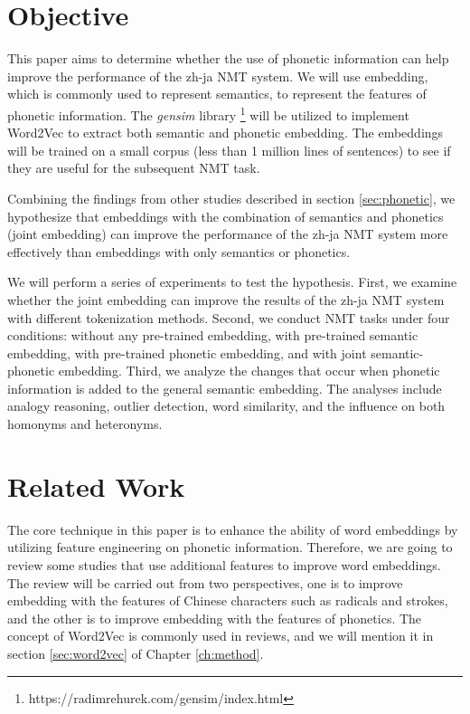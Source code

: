\section{Objective} \label{sec:objective}

This paper aims to determine whether the use of phonetic information can help improve the performance of the zh-ja NMT system. We will use embedding, which is commonly used to represent semantics, to represent the features of phonetic information. The \textit{gensim} library \footnote{https://radimrehurek.com/gensim/index.html} will be utilized to implement Word2Vec \cite{mikolov2013distributed} to extract both semantic and phonetic embedding. The embeddings will be trained on a small corpus (less than 1 million lines of sentences) to see if they are useful for the subsequent NMT task.

Combining the findings from other studies \cite{liu-etal-2019-robust, khan2019diversity} described in section \ref{sec:phonetic}, we hypothesize that embeddings with the combination of semantics and phonetics (joint embedding) can improve the performance of the zh-ja NMT system more effectively than embeddings with only semantics or phonetics. 

We will perform a series of experiments to test the hypothesis. First, we examine whether the joint embedding can improve the results of the zh-ja NMT system with different tokenization methods. Second, we conduct NMT tasks under four conditions: without any pre-trained embedding, with pre-trained semantic embedding, with pre-trained phonetic embedding, and with joint semantic-phonetic embedding. Third, we analyze the changes that occur when phonetic information is added to the general semantic embedding. The analyses include analogy reasoning, outlier detection, word similarity, and the influence on both homonyms and heteronyms.

\section{Related Work} \label{sec:related_work}

The core technique in this paper is to enhance the ability of word embeddings by utilizing feature engineering on phonetic information. Therefore, we are going to review some studies that use additional features to improve word embeddings. The review will be carried out from two perspectives, one is to improve embedding with the features of Chinese characters such as radicals and strokes, and the other is to improve embedding with the features of phonetics. The concept of Word2Vec \cite{mikolov2013distributed} is commonly used in reviews, and we will mention it in section \ref{sec:word2vec} of Chapter \ref{ch:method}.

